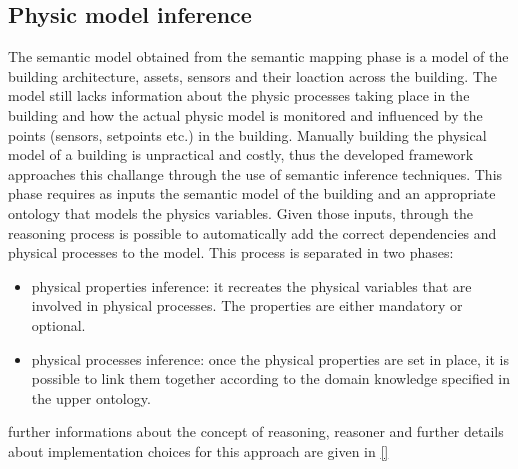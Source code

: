 \subsection{Physic model inference}
The semantic model obtained from the semantic mapping phase is a model of the building architecture, assets, sensors and their loaction across the building. The model still lacks information about the physic processes taking place in the building and how the actual physic model is monitored and influenced by the points (sensors, setpoints etc.) in the building. Manually building the physical model of a building is unpractical and costly, thus the developed framework approaches this challange through the use of semantic inference techniques. This phase requires as inputs the semantic model of the building and an appropriate ontology that models the physics variables. %
Given those inputs, through the reasoning process is possible to automatically add the correct dependencies and physical processes to the model. This process is separated in two phases:
\begin{itemize}
  \item physical properties inference: it recreates the physical variables that are involved in physical processes. The properties are either mandatory or optional.
  \item physical processes inference: once the physical properties are set in place, it is possible to link them together according to the domain knowledge specified in the upper ontology.
\end{itemize}
further informations about the concept of reasoning, reasoner and further details about implementation choices for this approach are given in \autoref{} %

